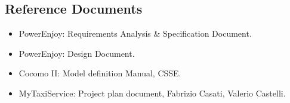 \subsection{Reference Documents}

\begin{itemize}
	\item PowerEnjoy: Requirements Analysis \& Specification Document.
	\item PowerEnjoy: Design Document.
	\item Cocomo II: Model definition Manual, CSSE.
	\item MyTaxiService: Project plan document, Fabrizio Casati, Valerio Castelli.
\end{itemize}
